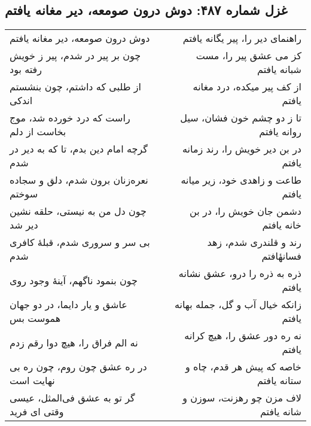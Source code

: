 \begin{center}
\section*{غزل شماره ۴۸۷: دوش درون صومعه، دیر مغانه یافتم}
\label{sec:487}
\begin{longtable}{l p{0.5cm} r}
دوش درون صومعه، دیر مغانه یافتم
&&
راهنمای دیر را، پیر یگانه یافتم
\\
چون بر پیر در شدم، پیر ز خویش رفته بود
&&
کز می عشق پیر را، مست شبانه یافتم
\\
از طلبی که داشتم، چون بنشستم اندکی
&&
از کف پیر میکده، درد مغانه یافتم
\\
راست که درد خورده شد، موج بخاست از دلم
&&
تا ز دو چشم خون فشان، سیل روانه یافتم
\\
گرچه امام دین بدم، تا که به دیر در شدم
&&
در بن دیر خویش را، رند زمانه یافتم
\\
نعره‌زنان برون شدم، دلق و سجاده سوختم
&&
طاعت و زاهدی خود، زیر میانه یافتم
\\
چون دل من به نیستی، حلقه نشین دیر شد
&&
دشمن جان خویش را، در بن خانه یافتم
\\
بی سر و سروری شدم، قبلهٔ کافری شدم
&&
رند و قلندری شدم، زهد فسانهٔافتم
\\
چون بنمود ناگهم، آینهٔ وجود روی
&&
ذره به ذره را درو، عشق نشانه یافتم
\\
عاشق و یار دایما، در دو جهان هموست بس
&&
زانکه خیال آب و گل، جمله بهانه یافتم
\\
نه الم فراق را، هیچ دوا رقم زدم
&&
نه ره دور عشق را، هیچ کرانه یافتم
\\
در ره عشق چون روم، چون ره بی نهایت است
&&
خاصه که پیش هر قدم، چاه و ستانه یافتم
\\
گر تو به عشق فی‌المثل، عیسی وقتی ای فرید
&&
لاف مزن چو رهزنت، سوزن و شانه یافتم
\\
\end{longtable}
\end{center}
